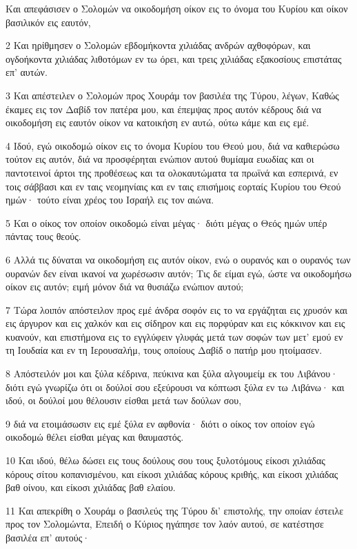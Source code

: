 \par Και απεφάσισεν ο Σολομών να οικοδομήση οίκον εις το όνομα του Κυρίου και οίκον βασιλικόν εις εαυτόν,
\par 2 Και ηρίθμησεν ο Σολομών εβδομήκοντα χιλιάδας ανδρών αχθοφόρων, και ογδοήκοντα χιλιάδας λιθοτόμων εν τω όρει, και τρεις χιλιάδας εξακοσίους επιστάτας επ' αυτών.
\par 3 Και απέστειλεν ο Σολομών προς Χουράμ τον βασιλέα της Τύρου, λέγων, Καθώς έκαμες εις τον Δαβίδ τον πατέρα μου, και έπεμψας προς αυτόν κέδρους διά να οικοδομήση εις εαυτόν οίκον να κατοικήση εν αυτώ, ούτω κάμε και εις εμέ.
\par 4 Ιδού, εγώ οικοδομώ οίκον εις το όνομα Κυρίου του Θεού μου, διά να καθιερώσω τούτον εις αυτόν, διά να προσφέρηται ενώπιον αυτού θυμίαμα ευωδίας και οι παντοτεινοί άρτοι της προθέσεως και τα ολοκαυτώματα τα πρωϊνά και εσπερινά, εν τοις σάββασι και εν ταις νεομηνίαις και εν ταις επισήμοις εορταίς Κυρίου του Θεού ημών· τούτο είναι χρέος του Ισραήλ εις τον αιώνα.
\par 5 Και ο οίκος τον οποίον οικοδομώ είναι μέγας· διότι μέγας ο Θεός ημών υπέρ πάντας τους θεούς.
\par 6 Αλλά τις δύναται να οικοδομήση εις αυτόν οίκον, ενώ ο ουρανός και ο ουρανός των ουρανών δεν είναι ικανοί να χωρέσωσιν αυτόν; Τις δε είμαι εγώ, ώστε να οικοδομήσω οίκον εις αυτόν; ειμή μόνον διά να θυσιάζω ενώπιον αυτού;
\par 7 Τώρα λοιπόν απόστειλον προς εμέ άνδρα σοφόν εις το να εργάζηται εις χρυσόν και εις άργυρον και εις χαλκόν και εις σίδηρον και εις πορφύραν και εις κόκκινον και εις κυανούν, και επιστήμονα εις το εγγλύφειν γλυφάς μετά των σοφών των μετ' εμού εν τη Ιουδαία και εν τη Ιερουσαλήμ, τους οποίους Δαβίδ ο πατήρ μου ητοίμασεν.
\par 8 Απόστειλόν μοι και ξύλα κέδρινα, πεύκινα και ξύλα αλγουμείμ εκ του Λιβάνου· διότι εγώ γνωρίζω ότι οι δούλοί σου εξεύρουσι να κόπτωσι ξύλα εν τω Λιβάνω· και ιδού, οι δούλοί μου θέλουσιν είσθαι μετά των δούλων σου,
\par 9 διά να ετοιμάσωσιν εις εμέ ξύλα εν αφθονία· διότι ο οίκος τον οποίον εγώ οικοδομώ θέλει είσθαι μέγας και θαυμαστός.
\par 10 Και ιδού, θέλω δώσει εις τους δούλους σου τους ξυλοτόμους είκοσι χιλιάδας κόρους σίτου κοπανισμένου, και είκοσι χιλιάδας κόρους κριθής, και είκοσι χιλιάδας βαθ οίνου, και είκοσι χιλιάδας βαθ ελαίου.
\par 11 Και απεκρίθη ο Χουράμ ο βασιλεύς της Τύρου δι' επιστολής, την οποίαν έστειλε προς τον Σολομώντα, Επειδή ο Κύριος ηγάπησε τον λαόν αυτού, σε κατέστησε βασιλέα επ' αυτούς·
